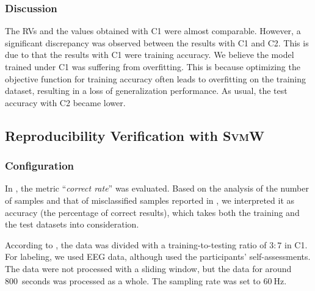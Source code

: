 \documentclass[letterpaper, 10 pt, conference]{ieeeconf}  %
\newcommand{\Impl}[1]{\textsc{#1}}
\begin{document}
\subsubsection{Discussion}

The RVs and the values obtained with C1 were almost comparable. 
However, a significant discrepancy was observed between the results with C1 and C2.
This is due to that the results with C1 were training accuracy.
%
%
We believe the model trained under C1 was suffering from overfitting.
{This is because optimizing the objective function for training accuracy often leads to overfitting on the training dataset, resulting in a loss of generalization performance.}
%
As usual, the test accuracy with C2 became lower.

\subsection{Reproducibility Verification with \Impl{SvmW}}

\subsubsection{Configuration}

In \cite{Zhao2009}, the metric ``\emph{correct rate}'' was evaluated.
Based on the analysis of the number of samples and that of misclassified samples reported in \cite{Zhao2009}, we interpreted it as accuracy (the percentage of correct results), which takes both the training and the test datasets into consideration.

According to \cite{Zhao2009}, the data was divided with a training-to-testing ratio of $3:7$ in C1.
For labeling, we used EEG data, although \cite{Zhao2009} used the participants' self-assessments.
The data were not processed with a sliding window, but the data for around 800~seconds was processed as a whole.
{The sampling rate was set to $60~\mathrm{Hz}$.}
\end{document}
